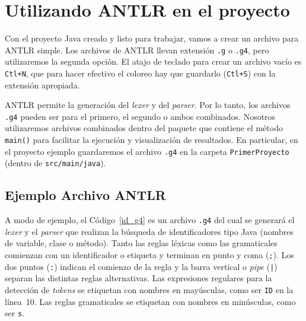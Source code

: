 \section{Utilizando ANTLR en el proyecto}
\label{archivo_antlr}

Con el proyecto Java creado y listo para trabajar, vamos a crear un archivo para ANTLR simple. Los archivos de ANTLR llevan extensión \verb|.g| o \verb|.g4|, pero utilizaremos la segunda opción.  El atajo de teclado para crear un archivo vacío es \verb|Ctl+N|, que para hacer efectivo el coloreo hay que guardarlo (\verb|Ctl+S|) con la extensión apropiada.

ANTLR permite la generación del \emph{lexer} y del \emph{parser}.  Por lo tanto, los archivos \verb|.g4| pueden ser para el primero, el segundo o ambos combinados.  Nosotros utilizaremos archivos combinados dentro del paquete que contiene el método \verb|main()| para facilitar la ejecución y visualización de resultados.  En particular, en el proyecto ejemplo guardaremos el archivo \verb|.g4| en la carpeta \verb|PrimerProyecto| (dentro de \verb|src/main/java|).


\subsection{Ejemplo Archivo ANTLR}
\label{ejemplo_archivo_antlr}

A modo de ejemplo, el Código~\ref{id_g4} es un archivo \verb|.g4| del cual se generará el \emph{lexer} y el \emph{parser} que realizan la búsqueda de identificadores tipo Java (nombres de variable, clase o método).  Tanto las reglas léxicas como las gramaticales comienzan con un identificador o etiqueta y terminan en punto y coma (\verb|;|).  Los dos puntos (\verb|:|) indican el comienzo de la regla y la barra vertical o \emph{pipe} (\verb-|-) separan las distintas reglas alternativas.  Las expresiones regulares para la detección de \emph{tokens} se etiquetan con nombres en mayúsculas, como ser \verb|ID| en la línea~10.  Las reglas gramaticales se etiquetan con nombres en minúsculas, como ser \verb|s|.



